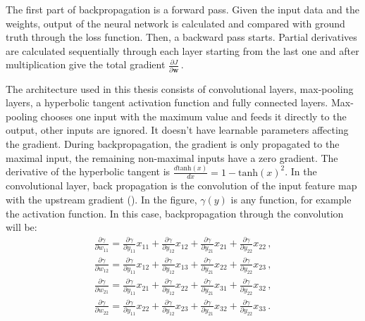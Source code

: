 The first part of backpropagation is a forward pass. Given the input data and the weights, output of the neural network is calculated and compared with ground truth through the loss function. Then, a backward pass starts. Partial derivatives are calculated sequentially through each layer starting from the last one and after multiplication give the total gradient $\frac{\partial J}{\partial \textbf{w}}$\,.

The architecture used in this thesis consists of convolutional layers, max-pooling layers, a hyperbolic tangent activation function and fully connected layers. Max-pooling chooses one input with the maximum value and feeds it directly to the output, other inputs are ignored. It doesn't have learnable parameters affecting the gradient. During backpropagation, the gradient is only propagated to the maximal input, the remaining non-maximal inputs have a zero gradient. The derivative of the hyperbolic tangent is $\frac{d\textrm{tanh}(x)}{dx} = 1-\textrm{tanh}(x)^2$. In the convolutional layer, back propagation is the convolution of the input feature map with the upstream gradient (). In the figure, $\gamma(y)$ is any function, for example the activation function. In this case, backpropagation through the convolution will be:
\begin{equation}
\begin{aligned}
	\frac{\partial \gamma}{\partial w_{11}} = \frac{\partial\gamma}{\partial y_{11}} x_{11} + \frac{\partial\gamma}{\partial y_{12}} x_{12} + \frac{\partial\gamma}{\partial y_{21}} x_{21} + \frac{\partial\gamma}{\partial y_{22}} x_{22}\,, \\
	\frac{\partial \gamma}{\partial w_{12}} = \frac{\partial\gamma}{\partial y_{11}} x_{12} + \frac{\partial\gamma}{\partial y_{12}} x_{13} + \frac{\partial\gamma}{\partial y_{21}} x_{22} + \frac{\partial\gamma}{\partial y_{22}} x_{23}\,, \\
	\frac{\partial \gamma}{\partial w_{21}} = \frac{\partial\gamma}{\partial y_{11}} x_{21} + \frac{\partial\gamma}{\partial y_{12}} x_{22} + \frac{\partial\gamma}{\partial y_{21}} x_{31} + \frac{\partial\gamma}{\partial y_{22}} x_{32}\,, \\
	\frac{\partial \gamma}{\partial w_{22}} = \frac{\partial\gamma}{\partial y_{11}} x_{22} + \frac{\partial\gamma}{\partial y_{12}} x_{23} + \frac{\partial\gamma}{\partial y_{21}} x_{32} + \frac{\partial\gamma}{\partial y_{22}} x_{33}\,.
\end{aligned}
\end{equation}

